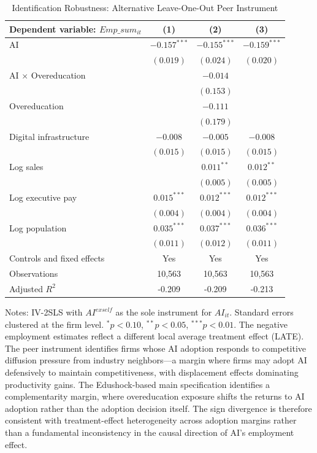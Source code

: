 \documentclass[12pt,a4paper]{article}
\theoremstyle{predstyle}
\theoremstyle{plain}
\begin{document}
\begin{table}[H]
\centering
\caption{Identification Robustness: Alternative Leave-One-Out Peer Instrument}
\label{tab:altiv}
\begin{threeparttable}
\small
\begin{tabular}{lccc}
\toprule
Dependent variable: \(Emp\_sum_{it}\) & (1) & (2) & (3) \\
\midrule
AI & \(-0.157^{***}\) & \(-0.155^{***}\) & \(-0.159^{***}\) \\
 & \((0.019)\) & \((0.024)\) & \((0.020)\) \\
AI \(\times\) Overeducation & & \(-0.014\) & \\
 & & \((0.153)\) & \\
Overeducation & & \(-0.111\) & \\
 & & \((0.179)\) & \\
Digital infrastructure & \(-0.008\) & \(-0.005\) & \(-0.008\) \\
 & \((0.015)\) & \((0.015)\) & \((0.015)\) \\
Log sales & & \(0.011^{**}\) & \(0.012^{**}\) \\
 & & \((0.005)\) & \((0.005)\) \\
Log executive pay & \(0.015^{***}\) & \(0.012^{***}\) & \(0.012^{***}\) \\
 & \((0.004)\) & \((0.004)\) & \((0.004)\) \\
Log population & \(0.035^{***}\) & \(0.037^{***}\) & \(0.036^{***}\) \\
 & \((0.011)\) & \((0.012)\) & \((0.011)\) \\
Controls and fixed effects & Yes & Yes & Yes \\
\midrule
Observations & 10,563 & 10,563 & 10,563 \\
Adjusted \(R^2\) & -0.209 & -0.209 & -0.213 \\
\bottomrule
\end{tabular}
\begin{tablenotes}
\footnotesize
\item Notes: IV-2SLS with \(AI^{exself}\) as the sole instrument for \(AI_{it}\). Standard errors clustered at the firm level. \(^{*}p<0.10\), \(^{**}p<0.05\), \(^{***}p<0.01\). The negative employment estimates reflect a different local average treatment effect (LATE). The peer instrument identifies firms whose AI adoption responds to competitive diffusion pressure from industry neighbors---a margin where firms may adopt AI defensively to maintain competitiveness, with displacement effects dominating productivity gains. The Edushock-based main specification identifies a complementarity margin, where overeducation exposure shifts the returns to AI adoption rather than the adoption decision itself. The sign divergence is therefore consistent with treatment-effect heterogeneity across adoption margins rather than a fundamental inconsistency in the causal direction of AI's employment effect.
\end{tablenotes}
\end{threeparttable}
\end{table}
\end{document}
